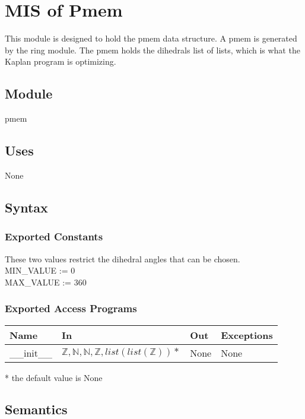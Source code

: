 \documentclass[12pt, titlepage]{article}
\newcommand{\progname}{Kaplan}
\begin{document}
\section{MIS of Pmem} \label{section-pmem} %

This module is designed to hold the pmem data structure. A pmem is generated by 
the ring module. The pmem holds the dihedrals list of lists, which is what the 
\progname{} program is optimizing.

\subsection{Module}

pmem

\subsection{Uses}

None

\subsection{Syntax}

\subsubsection{Exported Constants}

These two values restrict the dihedral angles that can be chosen.\\
\indent MIN\_VALUE := 0\\
\indent MAX\_VALUE := 360

\subsubsection{Exported Access Programs}

\begin{center}
	\begin{tabular}{p{2cm} p{4cm} p{4cm} p{2cm}}
		\hline
		\textbf{Name} & \textbf{In} & \textbf{Out} & \textbf{Exceptions} \\
		\hline
		\_\_init\_\_ & $\mathbb{Z}, \mathbb{N}, \mathbb{N}, \mathbb{Z}, 
		list(list(\mathbb{Z}))*$ & None 
		& None \\
		\hline
	\end{tabular}
\end{center}
* the default value is None

\subsection{Semantics}
\end{document}

